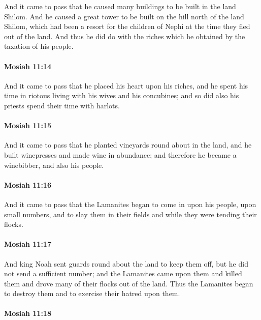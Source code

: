 			And it came to pass that he caused many buildings to be built in the land Shilom.
			And he caused a great tower to be built on the hill north of the land Shilom,
			which had been a resort for the children of Nephi
			at the time they fled out of the land.
			And thus he did do with the riches which he obtained by the taxation of his people.

		\paragraph{Mosiah 11:14} %
			\label{MOSIAH-11-14}

			And it came to pass that he placed his heart upon his riches,
			and he spent his time in riotous living with his wives and his concubines;
			and so did also his priests spend their time with harlots.

		\paragraph{Mosiah 11:15} %
			\label{MOSIAH-11-15}

			And it came to pass that he planted vineyards round about in the land,
			and he built winepresses and made wine in abundance;
			and therefore he became a winebibber, and also his people.

		\paragraph{Mosiah 11:16} %
			\label{MOSIAH-11-16}

			And it came to pass that the Lamanites began
			to come in upon his people, upon small numbers,
			and to slay them in their fields and while they were tending their flocks.

		\paragraph{Mosiah 11:17} %
			\label{MOSIAH-11-17}

			And king Noah sent guards round about the land to keep them off,
			but he did not send a sufficient number;
			and the Lamanites came upon them and killed them
			and drove many of their flocks out of the land.
			Thus the Lamanites began to destroy them and to exercise their hatred upon them.

		\paragraph{Mosiah 11:18} %
			\label{MOSIAH-11-18}

